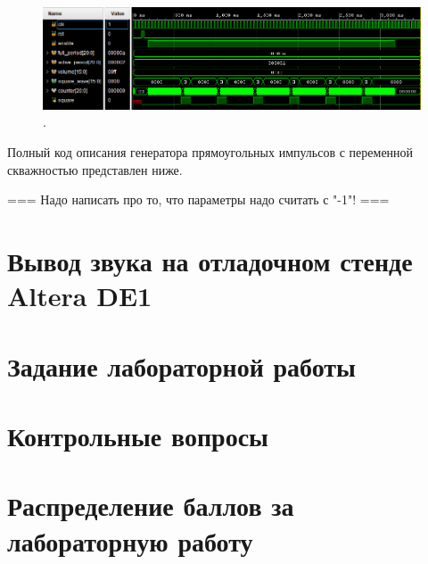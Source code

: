 \begin{figure}[H]
	\centering
	\includegraphics [width=1\textwidth] {images/lab_7/square_simulate2.PNG}
	\caption{.}
	\label{lab7:pic4}
\end{figure}

Полный код описания генератора прямоугольных импульсов с переменной скважностью представлен ниже.


\noindent
\begin{minipage}{\linewidth}
	
\end{minipage}


=== Надо написать про то, что параметры надо считать с "-1"! ===






\section{Вывод звука на отладочном стенде Altera DE1}


\section{Задание лабораторной работы}

\section{Контрольные вопросы}

\section{Распределение баллов за лабораторную работу}